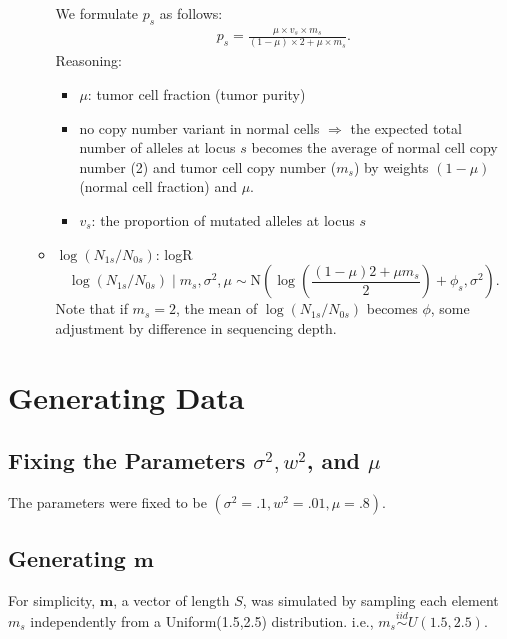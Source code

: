 \documentclass[12pt]{article}
\newcommand{\bc}{\mbox{\boldmath $c$}}
\newcommand{\Nor}{\mbox{N}}
\newcommand{\iid}{\stackrel{iid}{\sim}}
\begin{document}
\begin{enumerate}
\begin{itemize}
We formulate $p_s$ as follows:
\begin{eqnarray*}
p_s =\frac{\mu \times v_s  \times m_s}{(1-\mu)\times 2 + \mu \times m_s}.
\end{eqnarray*}
Reasoning:  
\begin{itemize}
\item $\mu$: tumor cell fraction (tumor purity)
\item no copy number variant in normal cells  $\Rightarrow$ the expected total number of alleles at locus $s$ becomes the average of normal cell copy number (2) and  tumor cell copy number ($m_s$) by weights $(1-\mu)$ (normal cell fraction) and $\mu$.
\item $v_s$: the proportion of mutated alleles at locus $s$
\end{itemize}

\item $\log(N_{1s}/N_{0s})$: logR
$$
\log(N_{1s}/N_{0s}) \mid m_s, \sigma^2, \mu \sim \Nor\left(\log\left(\frac{(1-\mu)2 + \mu m_s}{2}\right) + \phi_s, \sigma^2\right).
$$
Note that if $m_s=2$, the mean of $\log(N_{1s}/N_{0s})$ becomes $\phi$, some adjustment by difference in sequencing depth. 
\end{itemize}

\end{enumerate}

\newcommand{\ind}{\overset{ind}{\sim}}
\newcommand{\p}[1]{\left(#1\right)}
\newcommand{\bk}[1]{\left[#1\right]}
\renewcommand{\bc}[1]{ \left\{#1\right\} }
\newcommand{\abs}[1]{ \left|#1\right| }
\newcommand{\norm}[1]{ \left|\left|#1\right|\right| }
\newcommand{\N}{ \mathcal N }
\renewcommand{\L}{ \mathcal L }
\newcommand{\ds}{ \displaystyle }
\newcommand{\sums}{\sum_{s=1}^S}
\newcommand{\prods}{\prod_{s=1}^S}
\allowdisplaybreaks

\section{Generating Data}
\subsection{Fixing the Parameters $\sigma^2, w^2$, and $\mu$}
The parameters were fixed to be $(\sigma^2=.1, w^2=.01, \mu=.8)$.

\subsection{Generating $\bm m$}
For simplicity, $\bm m$, a vector of length $S$, was simulated by sampling 
each element $m_s$ independently from a Uniform(1.5,2.5) distribution. 
i.e., $m_s \iid U(1.5,2.5)$.
\end{document}
